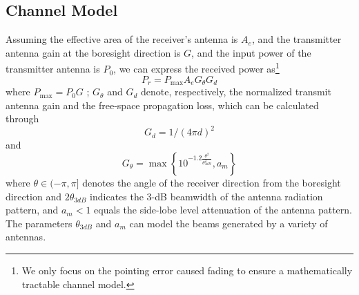 \documentclass{IEEEtran}
\begin{document}
\vspace{-3 pt}
\subsection{Channel Model}
{{Assuming the effective area of the receiver's antenna is $A_e$, and the transmitter antenna gain at the boresight direction is $G$, and the input power of the transmitter antenna is $P_{0}$, we can express the received power as\footnote{{We only focus on the pointing error caused fading to ensure a mathematically tractable channel model.}} \cite[Chap. 1]{ModernAntennaDesign2005}
\begin{equation}\label{eq-3}
{P_r} = {P_{\max }}A_{e}{G_\theta }{G_d}
\end{equation}
where $P_{\max }=P_{0} G$ ;  ${G_\theta }$ and ${G_d}$ denote, respectively, the normalized transmit antenna gain and the free-space propagation loss, which can be calculated through
\begin{equation}\label{eq-4}
{G_d} = 1/{{{{\left( {4\pi d} \right)}^2}}}
\end{equation}}}
and \cite[eq. (2)]{3DBeamforming_SPM2014}
\begin{equation}\label{eq-5}
{G_\theta } = \max \left\{ {{{10}^{ - 1.2\frac{{{\theta ^2}}}{{\theta _{3dB}^2}}}},{a_m}} \right\}
\end{equation}
where $\theta \in (-\pi,\pi]$ denotes the angle of the receiver direction from the boresight direction and $2\theta _{3dB}$ indicates the 3-dB beamwidth of the antenna radiation pattern, and {{$a_m<1$}} equals the side-lobe level attenuation of the antenna pattern. {{ The parameters $\theta_{3dB}$ and $a_m$ can model the beams generated by a variety of antennas.}}
\end{document}
